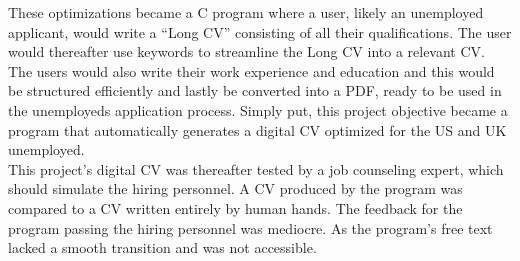These optimizations became a C program where a user, likely an unemployed applicant, would write a “Long CV” consisting of all their qualifications.
The user would thereafter use keywords to streamline the Long CV into a relevant CV.
The users would also write their work experience and education and this would be structured efficiently and lastly be converted into a PDF, ready to be used in the unemployeds application process. 
Simply put, this project objective became a program that automatically generates a digital CV optimized for the US and UK unemployed. \\

This project’s digital CV was thereafter tested by a job counseling expert, which should simulate the hiring personnel. 
A CV produced by the program was compared to a CV written entirely by human hands.
The feedback for the program passing the hiring personnel was mediocre. 
As the program’s free text lacked a smooth transition and was not accessible. 
\clearpage